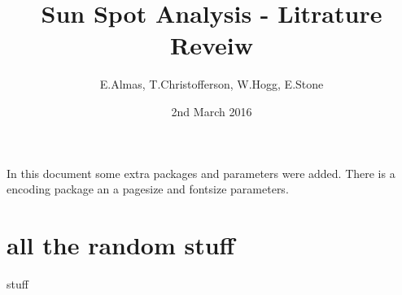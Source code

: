 \documentclass[12pt, letterpaper, twoside]{article}
\title{Sun Spot Analysis - Litrature Reveiw}
\author{E.Almas, T.Christofferson, W.Hogg, E.Stone }
\date{2nd March 2016}
\begin{document}
 \maketitle
 
In this document some extra packages and parameters
were added. There is a encoding package
\cite{blah}
an a pagesize and fontsize parameters.
\section*{all the random stuff}
stuff

\printbibliography
 
\end{document}
